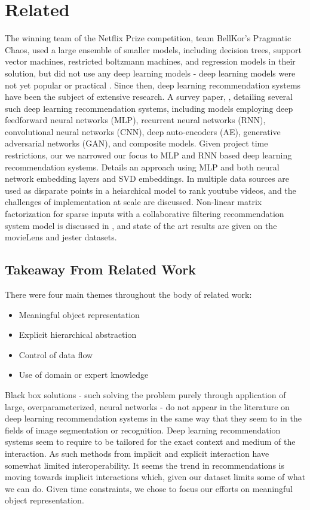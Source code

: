 \section{Related}
The winning team of the Netflix Prize competition, team BellKor's Pragmatic Chaos, used a large ensemble of smaller models, including decision trees, support vector machines, restricted boltzmann machines, and regression models in their solution, but did not use any deep learning models - deep learning models were not yet popular or practical \cite{Piotte 09th Pragmatic}\cite{bigChaos}\cite{Koren091the}. Since then, deep learning recommendation systems have been the subject of extensive research. A survey paper, \cite{DBLP:journals/corr/ZhangYS17aa}, detailing several such deep learning recommendation systems, including models employing deep feedforward neural networks (MLP), recurrent neural networks (RNN), convolutional neural networks (CNN), deep auto-encoders (AE), generative adversarial networks (GAN), and composite models. Given project time restrictions, our we narrowed our focus to MLP and RNN based deep learning recommendation systems.\cite{He2017} Details an approach using MLP and both neural network embedding layers and SVD embeddings. In \cite{45530} multiple data sources are used as disparate points in a heiarchical model to rank youtube videos, and the challenges of implementation at scale are discussed. Non-linear matrix factorization for sparse inputs with a collaborative filtering recommendation system model is discussed in \cite{strub:hal-01256422}, and state of the art results are given on the movieLens and jester datasets. 
\subsection{Takeaway From Related Work}
There were four main themes throughout the body of related work:
\begin{itemize}
\item Meaningful object representation
\item Explicit hierarchical abstraction
\item Control of data flow
\item Use of domain or expert knowledge
\end{itemize}
Black box solutions - such solving the problem purely through application of large, overparameterized, neural networks - do not appear in the literature on deep learning recommendation systems in the same way that they seem to in the fields of image segmentation or recognition. Deep learning recommendation systems seem to require to be tailored for the exact context and medium of the interaction. As such methods from implicit and explicit interaction have somewhat limited interoperability. It seems the trend in recommendations is moving towards implicit interactions which, given our dataset limits some of what we can do. Given time constraints, we chose to focus our efforts on meaningful object representation.  
